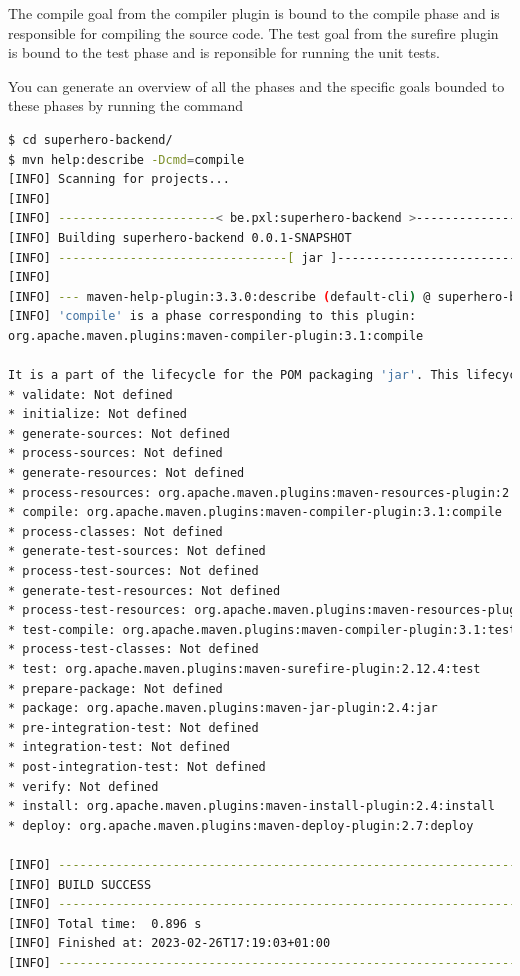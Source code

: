 The compile goal from the compiler plugin is bound to the compile phase and is responsible for compiling the source code. The test goal from the surefire plugin is bound to the test phase and is reponsible for running the unit tests.

You can generate an overview of all the phases and the specific goals bounded to these phases by running the command 

\begin{lstlisting}[language=bash, frame=single]
$ cd superhero-backend/
$ mvn help:describe -Dcmd=compile
[INFO] Scanning for projects...
[INFO] 
[INFO] ----------------------< be.pxl:superhero-backend >----------------------
[INFO] Building superhero-backend 0.0.1-SNAPSHOT
[INFO] --------------------------------[ jar ]---------------------------------
[INFO]
[INFO] --- maven-help-plugin:3.3.0:describe (default-cli) @ superhero-backend ---
[INFO] 'compile' is a phase corresponding to this plugin:
org.apache.maven.plugins:maven-compiler-plugin:3.1:compile

It is a part of the lifecycle for the POM packaging 'jar'. This lifecycle includes the following phases:
* validate: Not defined
* initialize: Not defined
* generate-sources: Not defined
* process-sources: Not defined
* generate-resources: Not defined
* process-resources: org.apache.maven.plugins:maven-resources-plugin:2.6:resources
* compile: org.apache.maven.plugins:maven-compiler-plugin:3.1:compile
* process-classes: Not defined
* generate-test-sources: Not defined
* process-test-sources: Not defined
* generate-test-resources: Not defined
* process-test-resources: org.apache.maven.plugins:maven-resources-plugin:2.6:testResources
* test-compile: org.apache.maven.plugins:maven-compiler-plugin:3.1:testCompile
* process-test-classes: Not defined
* test: org.apache.maven.plugins:maven-surefire-plugin:2.12.4:test
* prepare-package: Not defined
* package: org.apache.maven.plugins:maven-jar-plugin:2.4:jar
* pre-integration-test: Not defined
* integration-test: Not defined
* post-integration-test: Not defined
* verify: Not defined
* install: org.apache.maven.plugins:maven-install-plugin:2.4:install
* deploy: org.apache.maven.plugins:maven-deploy-plugin:2.7:deploy

[INFO] ------------------------------------------------------------------------
[INFO] BUILD SUCCESS
[INFO] ------------------------------------------------------------------------
[INFO] Total time:  0.896 s
[INFO] Finished at: 2023-02-26T17:19:03+01:00
[INFO] ------------------------------------------------------------------------
\end{lstlisting}


